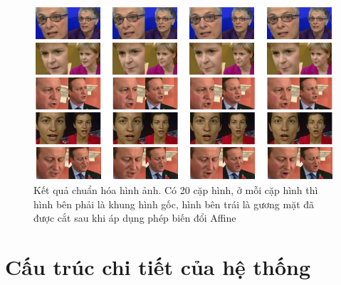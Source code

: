 \begin{figure}[H]
    \centering
    \includegraphics[width=15cm]{./content/materials/preprocess-image.png}
    \caption{Kết quả chuẩn hóa hình ảnh. Có 20 cặp hình, ở mỗi cặp hình thì hình bên phải là khung hình gốc, hình bên trái là gương mặt đã được cắt sau khi áp dụng phép biến đổi Affine}
\end{figure}


\section{Cấu trúc chi tiết của hệ thống}

